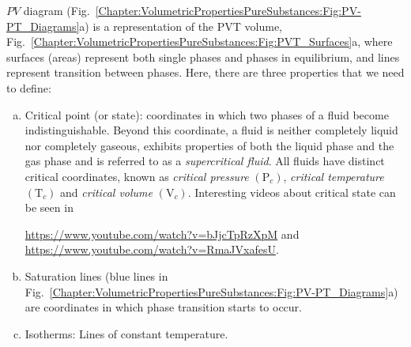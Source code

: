 $PV$ diagram (Fig.~\ref{Chapter:VolumetricPropertiesPureSubstances:Fig:PV-PT_Diagrams}a) is a representation of the PVT volume, Fig.~\ref{Chapter:VolumetricPropertiesPureSubstances:Fig:PVT_Surfaces}a, where surfaces (\ie areas) represent both single phases and phases in equilibrium, and lines represent transition between phases. Here, there are three properties that we need to define:
           \begin{enumerate}[a)]
              \item Critical point (or state): coordinates in which two phases of a fluid become indistinguishable. Beyond this coordinate, a fluid is neither completely liquid nor completely gaseous, \ie exhibits properties of both the liquid phase and the gas phase and is referred to as a {\it supercritical fluid}. All fluids have distinct critical coordinates, known as {\it critical pressure} $\left(\text{P}_{c}\right)$, {\it critical temperature} $\left(\text{T}_{c}\right)$ and {\it critical volume} $\left(\text{V}_{c}\right)$. Interesting videos about critical state can be seen in 
                  \begin{center}
                     \href{https://www.youtube.com/watch?v=bJjcTpRzXpM}{https://www.youtube.com/watch?v=bJjcTpRzXpM} and \\
                     \href{https://www.youtube.com/watch?v=RmaJVxafesU}{https://www.youtube.com/watch?v=RmaJVxafesU}.
                  \end{center}
              \item Saturation lines (blue lines in Fig.~\ref{Chapter:VolumetricPropertiesPureSubstances:Fig:PV-PT_Diagrams}a) are coordinates in which phase transition starts to occur.
              \item Isotherms: Lines of constant temperature.
           \end{enumerate}

